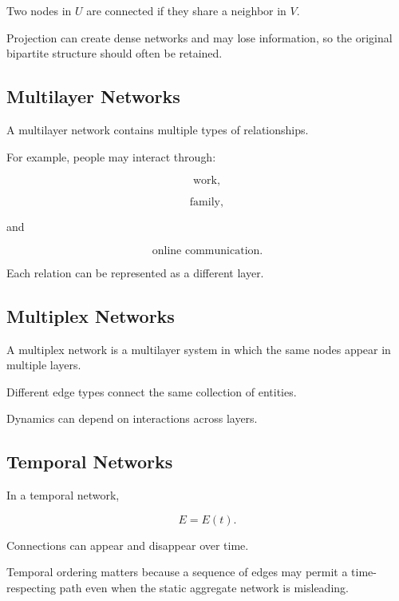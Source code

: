 Two nodes in \(U\) are connected if they share a neighbor in \(V\).

Projection can create dense networks and may lose information, so the
original bipartite structure should often be retained.

\subsection{Multilayer Networks}
\label{subsec:multilayer-networks}

A multilayer network contains multiple types of relationships.

For example, people may interact through:

\[
\boxed{
\text{work},
}
\]

\[
\boxed{
\text{family},
}
\]

and

\[
\boxed{
\text{online communication}.
}
\]

Each relation can be represented as a different layer.

\subsection{Multiplex Networks}
\label{subsec:multiplex-networks}

A multiplex network is a multilayer system in which the same nodes appear in
multiple layers.

Different edge types connect the same collection of entities.

Dynamics can depend on interactions across layers.

\subsection{Temporal Networks}
\label{subsec:temporal-networks}

In a temporal network,

\[
\boxed{
E=E(t).
}
\]

Connections can appear and disappear over time.

Temporal ordering matters because a sequence of edges may permit a
time-respecting path even when the static aggregate network is misleading.

